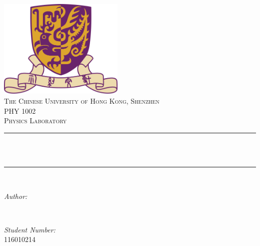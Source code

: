 \begin{titlepage}
    \centering
    \vspace*{0.5 cm}
    \includegraphics[scale = 0.75,width=6cm]{CUHK}\\[1.0 cm]   %
    \textsc{\large The Chinese University of Hong Kong, Shenzhen}\\[2.0 cm]   %
    \textsc{\Large PHY 1002}\\[0.5 cm]               %
    \textsc{\large Physics Laboratory}\\[0.5 cm]               %
    \rule{\linewidth}{0.2 mm} \\[0.4 cm]
    { \huge \bfseries \thetitle}\\
    \rule{\linewidth}{0.2 mm} \\[1.5 cm]
    
    \begin{minipage}{0.4\textwidth}
        \begin{flushleft} \large
            \emph{Author:}\\
            \theauthor
            \end{flushleft}
            \end{minipage}~
            \begin{minipage}{0.4\textwidth}
            \begin{flushright} \large
            \emph{Student Number:} \\
            116010214                                   %
        \end{flushright}
    \end{minipage}\\[2 cm]
    
    {\large \thedate}\\[2 cm]
 
    \vfill
    
\end{titlepage}


\tableofcontents
\pagebreak

